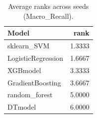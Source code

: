 \begin{table}[t]
\centering
\begin{tabular}{lr}
\toprule
Model & rank \\
\midrule
sklearn_SVM & 1.3333 \\
LogisticRegression & 1.6667 \\
XGBmodel & 3.3333 \\
GradientBoosting & 3.6667 \\
random_forest & 5.0000 \\
DTmodel & 6.0000 \\
\bottomrule
\end{tabular}
\caption{Average ranks across seeds (Macro_Recall).}
\label{tab:avg_rank_Macro_Recall}
\end{table}